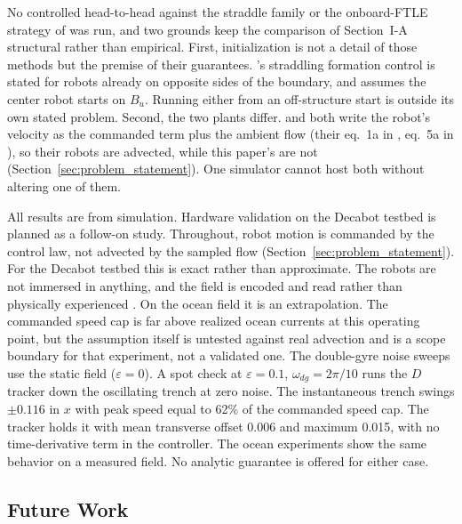 \documentclass[lettersize,journal]{IEEEtran}
\begin{document}
No controlled head-to-head against the straddle family
\cite{17,18,19} or the onboard-FTLE strategy of \cite{21} was run, and
two grounds keep the comparison of Section~\mbox{I-A} structural rather
than empirical. First, initialization is not a detail of those methods
but the premise of their guarantees. \cite{17}'s straddling formation
control is stated for robots already on opposite sides of the boundary,
and \cite{21} assumes the center robot starts on $B_u$. Running either
from an off-structure start is outside its own stated problem. Second,
the two plants differ. \cite{17,18,19,20} and \cite{21} both write the
robot's velocity as the commanded term plus the ambient flow (their
eq.~1a in \cite{17}, eq.~5a in \cite{21}), so their robots are
advected, while this paper's are not
(Section~\ref{sec:problem_statement}). One simulator cannot host both
without altering one of them.

All results are from simulation. Hardware validation on the Decabot
testbed is planned as a follow-on study. Throughout, robot motion is
commanded by the control law, not advected by the sampled flow
(Section~\ref{sec:problem_statement}). For the Decabot testbed this is
exact rather than approximate. The robots are not immersed in anything,
and the field is encoded and read rather than physically experienced
\cite{40}. On the ocean field it is an extrapolation. The commanded
speed cap is far above realized ocean currents at this operating point,
but the assumption itself is untested against real advection and is a
scope boundary for that experiment, not a validated one. The double-gyre noise sweeps
use the static field ($\varepsilon = 0$). A spot check at
$\varepsilon = 0.1$, $\omega_{dg} = 2\pi/10$ runs the $D$ tracker down
the oscillating trench at zero noise. The instantaneous trench swings
$\pm 0.116$ in $x$ with peak speed equal to 62\% of the commanded
speed cap. The tracker holds it with mean transverse offset 0.006
and maximum 0.015, with no time-derivative term in the controller. The
ocean experiments show the same behavior on a measured field. No
analytic guarantee is offered for either case.

\subsection{Future Work}
\label{sec:future}
\end{document}
